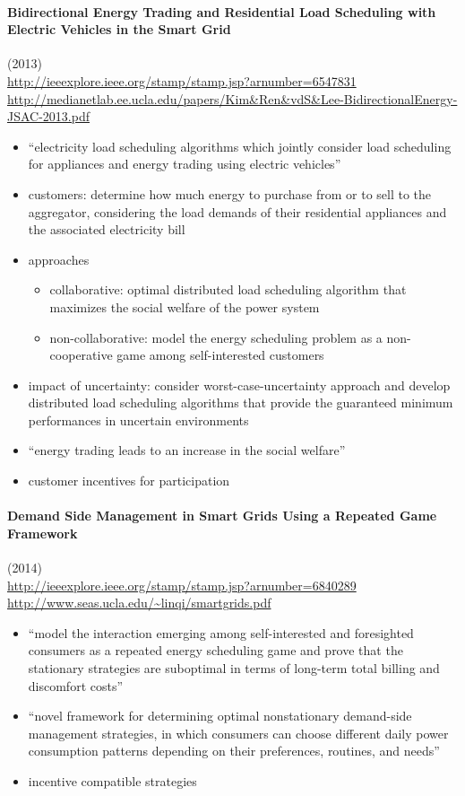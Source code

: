 \documentclass{article}
\begin{document}
\paragraph{Bidirectional Energy Trading and Residential Load Scheduling with Electric Vehicles in the Smart Grid} (2013)
\cite{kim2013bidirectional} \\
\url{http://ieeexplore.ieee.org/stamp/stamp.jsp?arnumber=6547831} \\
\url{http://medianetlab.ee.ucla.edu/papers/Kim&Ren&vdS&Lee-BidirectionalEnergy-JSAC-2013.pdf}
\begin{itemize}
\item ``electricity load scheduling algorithms which jointly consider load scheduling for appliances and energy trading using electric vehicles''
\item customers: determine how much energy to purchase from or to sell to the aggregator, considering the load demands of their residential appliances and the associated electricity bill
\item approaches
\begin{itemize}
\item collaborative: optimal distributed load scheduling algorithm that maximizes the social welfare of the power system
\item non-collaborative: model the energy scheduling problem as a non-cooperative game among self-interested customers
\end{itemize}
\item impact of uncertainty: consider worst-case-uncertainty approach and develop distributed load scheduling algorithms that provide the guaranteed minimum performances in uncertain environments
\item ``energy trading leads to an increase in the social welfare''
\item customer incentives for participation
\end{itemize}

\paragraph{Demand Side Management in Smart Grids Using a Repeated Game Framework} (2014)
\cite{song2014demand} \\
\url{http://ieeexplore.ieee.org/stamp/stamp.jsp?arnumber=6840289} \\
\url{http://www.seas.ucla.edu/~linqi/smartgrids.pdf}
\begin{itemize}
\item ``model the interaction emerging among self-interested and foresighted consumers as a repeated energy scheduling game and prove that the stationary strategies are suboptimal in terms of long-term total billing and discomfort costs''
\item ``novel framework for determining optimal nonstationary demand-side management strategies, in which consumers can choose different daily power consumption patterns depending on their preferences, routines, and needs''
\item incentive compatible strategies
\end{itemize}
\end{document}
